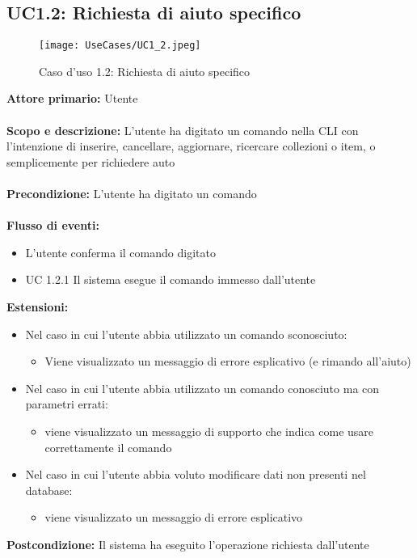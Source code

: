 \documentclass{scalatekids-article}
\begin{document}
\subsection{UC1.2: Richiesta di aiuto specifico}
\begin{figure}[H]
  \texttt{[image: UseCases/UC1\_2.jpeg]}
  \caption{Caso d'uso 1.2: Richiesta di aiuto specifico}
\end{figure}
\textbf{Attore primario:} Utente \\ \\
\textbf{Scopo e descrizione:}  L’utente ha digitato un comando nella CLI con l’intenzione di inserire, cancellare, aggiornare, ricercare collezioni o item, o semplicemente per richiedere auto\\ \\
\textbf{Precondizione:} L’utente ha digitato un comando\\ \\
\textbf{Flusso di eventi:}
\begin{itemize}
\item L’utente conferma il comando digitato
\item UC 1.2.1 Il sistema esegue il comando immesso dall’utente
\end{itemize}
\textbf{Estensioni:}
\begin{itemize}
\item Nel caso in cui l’utente abbia utilizzato un comando sconosciuto:
  \begin{itemize}
  \item Viene visualizzato un messaggio di errore esplicativo (e rimando all'aiuto)
  \end{itemize}
\item Nel caso in cui l’utente abbia utilizzato un comando conosciuto ma con parametri errati:
  \begin{itemize}
  \item viene visualizzato un messaggio di supporto che indica come usare correttamente il comando
  \end{itemize}
\item Nel caso in cui l’utente abbia voluto modificare dati non presenti nel database:
  \begin{itemize}
    \item viene visualizzato un messaggio di errore esplicativo
  \end{itemize}
\end{itemize}
\textbf{Postcondizione:} Il sistema ha eseguito l’operazione richiesta dall’utente
\end{document}

